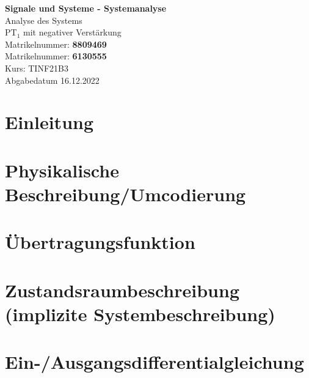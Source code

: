\documentclass[
  ngerman
  ,12pt
  ,pdftex
]{article}
\begin{document}
\begin{titlepage}
  \begin{center}
      {\Huge \textbf{Signale und Systeme - Systemanalyse}}\\[1.5cm]
      {\Large Analyse des Systems}\\[1cm]
      {\Huge PT$_{1}$ mit negativer Verstärkung}\\[7cm]
      {\large Matrikelnummer: \textbf{8809469}}\\[0.5cm]
      {\large Matrikelnummer: \textbf{6130555}}\\[0.5cm]
      {\large Kurs: TINF21B3}\\[0.5cm]
      {\large Abgabedatum 16.12.2022}
      \vfill
  \end{center}
\end{titlepage}
\newpage
\tableofcontents
\newpage



\section{Einleitung}    %


% 

\section{Physikalische Beschreibung/Umcodierung}


\section{Übertragungsfunktion}    %


\section{Zustandsraumbeschreibung (implizite Systembeschreibung)}


\section{Ein-/Ausgangsdifferentialgleichung}

\end{document}
